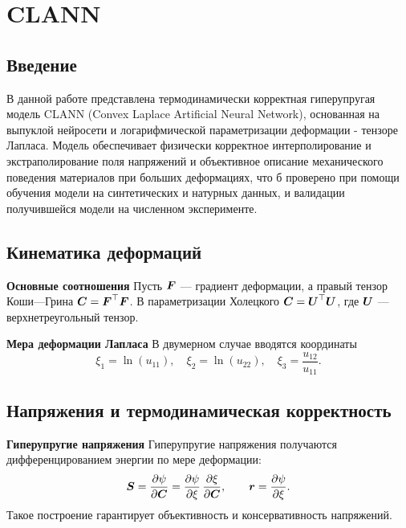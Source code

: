 \chapter{CLANN}

\section{Введение}
В данной работе представлена термодинамически корректная гиперупругая модель CLANN 
(Convex Laplace Artificial Neural Network),
основанная на выпуклой нейросети и логарифмической параметризации деформации - тензоре Лапласа. 
Модель обеспечивает физически корректное интерполирование и экстраполирование поля напряжений и объективное описание механического поведения материалов при больших деформациях,
что б проверено при помощи обучения модели на синтетических и натурных данных, и валидации получившейся модели на численном эксперименте.

\section{Кинематика деформаций}
\textbf{Основные соотношения}
Пусть \(\boldsymbol{F}\) — градиент деформации, а правый тензор Коши—Грина \(\boldsymbol{C} = \boldsymbol{F}^{\top} \boldsymbol{F}\).
В параметризации Холецкого \(\boldsymbol{C} = \boldsymbol{U}^{\top}\boldsymbol{U}\), где \(\boldsymbol{U}\) — верхнетреугольный тензор.

\textbf{Мера деформации Лапласа}
В двумерном случае вводятся координаты
\begin{equation}
\xi_1 = \ln(u_{11}),\quad \xi_2 = \ln(u_{22}),\quad \xi_3 = \frac{u_{12}}{u_{11}}.
\end{equation}

\section{Напряжения и термодинамическая корректность}
\textbf{Гиперупругие напряжения}
Гиперупругие напряжения получаются дифференцированием энергии по мере деформации:
\begin{equation}
 \boldsymbol{S} = \frac{\partial\psi}{\partial\boldsymbol{C}} = \frac{\partial\psi}{\partial \xi}\,\frac{\partial \xi}{\partial \boldsymbol{C}},\qquad \boldsymbol{r}=\frac{\partial\psi}{\partial\xi}.
\label{eq:hyperelastic_stress}
\end{equation}
Такое построение гарантирует объективность и консервативность напряжений.

